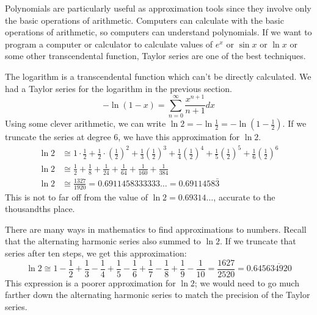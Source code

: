 \documentclass[fleqn,letterpaper]{report}
\begin{document}
Polynomials are particularly useful as approximation tools
since they involve only the basic operations of arithmetic.
Computers can calculate with the basic operations of
arithmetic, so computers can understand polynomials. If we
want to program a computer or calculator to calculate values
of $e^x$ or $\sin x$ or $\ln x$ or some other transcendental
function, Taylor series are one of the best techniques. 

\begin{example}
The logarithm is a transcendental function which can't
be directly calculated. We had a Taylor series for the
logarithm in the previous section.
\begin{equation*}
-\ln (1-x) = \sum_{n=0}^\infty \frac{x^{n+1}}{n+1} dx
\end{equation*}
Using some clever arithmetic, we can write $\ln 2 = - \ln
\frac{1}{2} = - \ln \left( 1 - \frac{1}{2} \right)$. If we
truncate the series at degree $6$, we have this approximation
for $\ln 2$.
\begin{align*}
\ln 2 & \cong 1 \cdot \frac{1}{2} + \frac{1}{2} \cdot \left(
\frac{1}{2} \right)^2 + \frac{1}{3} \left( \frac{1}{2}
\right)^3 + \frac{1}{4} \left( \frac{1}{2} \right)^4 +
\frac{1}{5} \left( \frac{1}{2} \right)^5 + \frac{1}{6} \left(
\frac{1}{2} \right)^6 \\
\ln 2 & \cong \frac{1}{2} + \frac{1}{8} + \frac{1}{24} +
\frac{1}{64} + \frac{1}{160} + \frac{1}{384} \\
\ln 2 & \cong \frac{1327}{1920} = 0.6911458333333 \ldots 
= 0.6911458\bar{3}
\end{align*}
This is not to far off from the value of $\ln 2 =
0.69314\ldots$, accurate to the thousandths place. 
\end{example}

\begin{example}
There are many ways in mathematics to find approximations to
numbers. Recall that the alternating harmonic series also
summed to $\ln 2$. If we truncate that series after ten
steps, we get this approximation:
\begin{equation*}
\ln 2 \cong 1 - \frac{1}{2} + \frac{1}{3} - \frac{1}{4} +
\frac{1}{5} - \frac{1}{6} + \frac{1}{7} - \frac{1}{8} +
\frac{1}{9} - \frac{1}{10} = \frac{1627}{2520} =
0.645\overline{634920}
\end{equation*}
This expression is a poorer approximation for $\ln 2$; we
would need to go much farther down the alternating harmonic
series to match the precision of the Taylor series.
\end{example}
\end{document}
